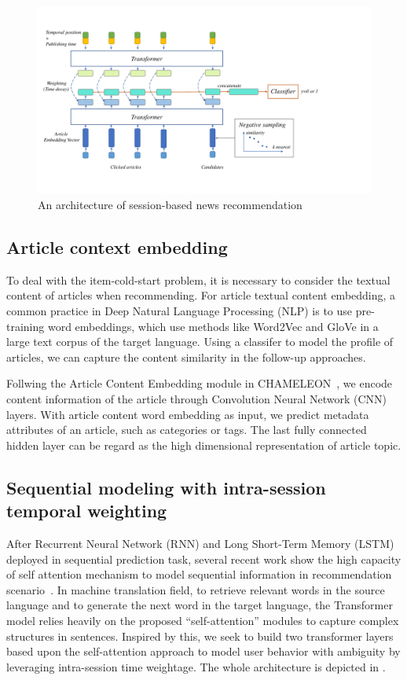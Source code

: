 \begin{figure}[!htp]
    \centering
    \includegraphics[width=12cm]{fig/architecture.pdf}
    \caption{An architecture of session-based news recommendation}
    \label{fig:architecture}
\end{figure}
\subsection{Article context embedding}
\label{sec:3.1}
To deal with the item-cold-start problem, it is necessary to consider the textual content of articles when recommending. For article textual content embedding, a common practice in Deep Natural Language Processing (NLP) is to use pre-training word embeddings, which use methods like Word2Vec and GloVe in a large text corpus of the target language. Using a classifer to model the profile of articles, we can capture the content similarity in the follow-up approaches.

Follwing the Article Content Embedding module in CHAMELEON~\cite{moreira_importance_2019}, we encode content information of the article through Convolution Neural Network (CNN) layers. With article content word embedding as input, we predict metadata attributes of an article, such as categories or tags. The last fully connected hidden layer can be regard as the high dimensional representation of article topic. 

\subsection{Sequential modeling with intra-session temporal weighting}
After Recurrent Neural Network (RNN) and Long Short-Term Memory (LSTM)~\cite{guo_streaming_2019,hidasi2015session,wang2019modeling} deployed in sequential prediction task, several recent work show the high capacity of self attention mechanism to model sequential information in recommendation scenario~\cite{kang_self-attentive_2018,liu2018stamp,xu2019time}.
\label{sec:3.2}
In machine translation field, to retrieve relevant words in the source language and to generate the next word in the target language, the Transformer model relies heavily on the proposed ``self-attention'' modules to capture complex structures in sentences. Inspired by this, we seek to build two transformer layers based upon the self-attention approach to model user behavior with ambiguity by leveraging intra-session time weightage. The whole architecture is depicted in .
